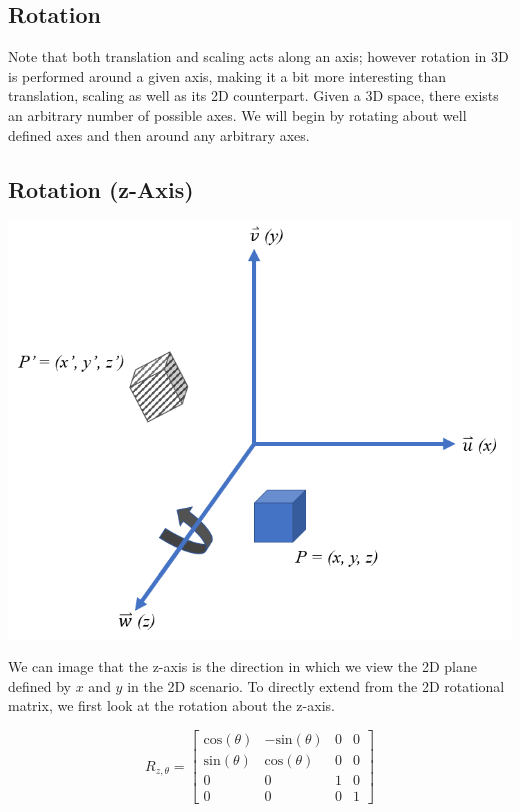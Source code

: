 \documentclass[12pt,letterpaper]{article}
\begin{document}
\subsection{Rotation}
Note that both translation and scaling acts along an axis; however rotation in 3D is performed around a given axis, making it a bit more interesting than translation, scaling as well as its 2D counterpart. Given a 3D space, there exists an arbitrary number of possible axes.  We will begin by rotating about well defined axes and then around any arbitrary axes.

\subsection{Rotation (z-Axis)}
\includegraphics[scale=0.75]{zRotation}

We can image that the z-axis is the direction in which we view the 2D plane defined by $x$ and $y$ in the 2D scenario. To directly extend from the 2D rotational matrix, we first look at the rotation about the z-axis.

\begin{equation}
    R_{z, \theta} = \begin{bmatrix}
        \text{cos}(\theta) & -\text{sin}(\theta) & 0 & 0 \\
        \text{sin}(\theta) &  \text{cos}(\theta) & 0 & 0 \\
        0 & 0 & 1 & 0 \\
        0 & 0 & 0 & 1
    \end{bmatrix}
\end{equation}
\end{document}
